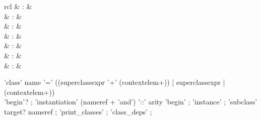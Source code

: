 \begin{isabellebody}
\begin{isamarkuptext}
  \begin{matharray}{rcl}
    \hypertarget{command.class}{\hyperlink{command.class}{\mbox{}}} & : &  \\
    \hypertarget{command.instantiation}{\hyperlink{command.instantiation}{\mbox{}}} & : &  \\
    \hypertarget{command.instance}{\hyperlink{command.instance}{\mbox{}}} & : &  \\
    \hypertarget{command.subclass}{\hyperlink{command.subclass}{\mbox{}}} & : &  \\
    \hypertarget{command.print-classes}{\hyperlink{command.print-classes}{\mbox{}}}\isa{{\isachardoublequote}\isactrlsup {\isacharasterisk}{\isachardoublequote}} & : &  \\
    \hypertarget{command.class-deps}{\hyperlink{command.class-deps}{\mbox{}}}\isa{{\isachardoublequote}\isactrlsup {\isacharasterisk}{\isachardoublequote}} & : &  \\
    \hypertarget{method.intro-classes}{\hyperlink{method.intro-classes}{\mbox{}}} & : &  \\
  \end{matharray}

  \begin{rail}
    'class' name '=' ((superclassexpr '+' (contextelem+)) | superclassexpr | (contextelem+)) \\
      'begin'?
    ;
    'instantiation' (nameref + 'and') '::' arity 'begin'
    ;
    'instance'
    ;
    'subclass' target? nameref
    ;
    'print\_classes'
    ;
    'class\_deps'
    ;


\end{rail}
\end{isamarkuptext}
\end{isabellebody}

